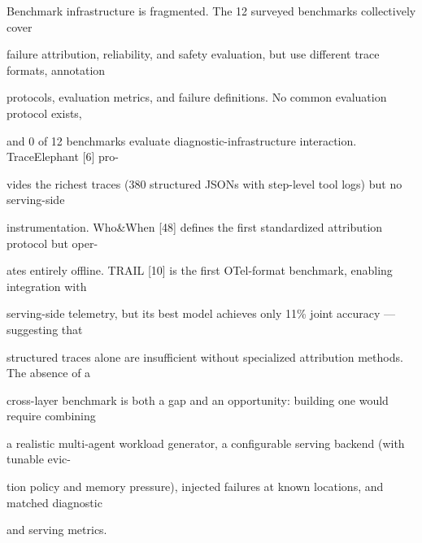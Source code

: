 \begin{flushleft}
\noindent Benchmark infrastructure is fragmented. The 12 surveyed benchmarks collectively cover\par
\noindent failure attribution, reliability, and safety evaluation, but use different trace formats, annotation\par
\noindent protocols, evaluation metrics, and failure definitions. No common evaluation protocol exists,\par
\noindent and 0 of 12 benchmarks evaluate diagnostic-infrastructure interaction. TraceElephant [6] pro-\par
\noindent vides the richest traces (380 structured JSONs with step-level tool logs) but no serving-side\par
\noindent instrumentation. Who\&When [48] defines the first standardized attribution protocol but oper-\par
\noindent ates entirely offline. TRAIL [10] is the first OTel-format benchmark, enabling integration with\par
\noindent serving-side telemetry, but its best model achieves only 11\% joint accuracy — suggesting that\par
\noindent structured traces alone are insufficient without specialized attribution methods. The absence of a\par
\noindent cross-layer benchmark is both a gap and an opportunity: building one would require combining\par
\noindent a realistic multi-agent workload generator, a configurable serving backend (with tunable evic-\par
\noindent tion policy and memory pressure), injected failures at known locations, and matched diagnostic\par
\noindent and serving metrics.\par
\end{flushleft}
